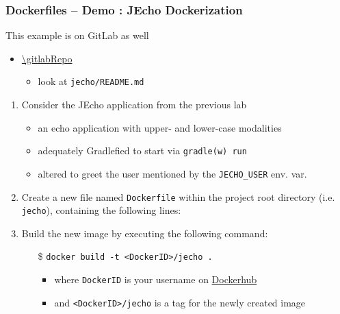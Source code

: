 \documentclass[presentation]{beamer}\mode<presentation>{\usetheme{AMSBolognaFC}}
\begin{document}
\startDemo
\begin{frame}[allowframebreaks]
\frametitle{Dockerfiles -- Demo \currentDemo: JEcho Dockerization}

    \begin{exampleblock}{This example is on GitLab as well}
        \begin{itemize}\small
            \item \url{\gitlabRepo}
            \begin{itemize}
                \item look at \texttt{jecho/README.md}
            \end{itemize}
        \end{itemize}
    \end{exampleblock}

    \framebreak

    \begin{enumerate}

        \item Consider the JEcho application from the previous lab
        \begin{itemize}
            \item an echo application with upper- and lower-case modalities
            \item adequately Gradlefied to start via \alert{\texttt{gradle(w) run}}
            \item altered to greet the user mentioned by the \alert{\texttt{JECHO\_USER}} env. var.
        \end{itemize}

        \framebreak

        \item Create a new file named \alert{\texttt{Dockerfile}} within the project root directory (i.e. \alert{\texttt{jecho}}), containing the following lines:
        

        \framebreak

        \item Build the new image by executing the following command:
        \begin{itemize}
            \item[\$] \texttt{docker \alert{build} -t <DockerID>/jecho \alert{.}}
            \begin{itemize}
                \item where \texttt{DockerID} is your username on \href{https://hub.docker.com/}{Dockerhub}
                \item and \alert{\texttt{<DockerID>/jecho}} is a \alert{tag} for the newly created image
            \end{itemize}
        \end{itemize}


\end{enumerate}
\end{frame}
\end{document}
